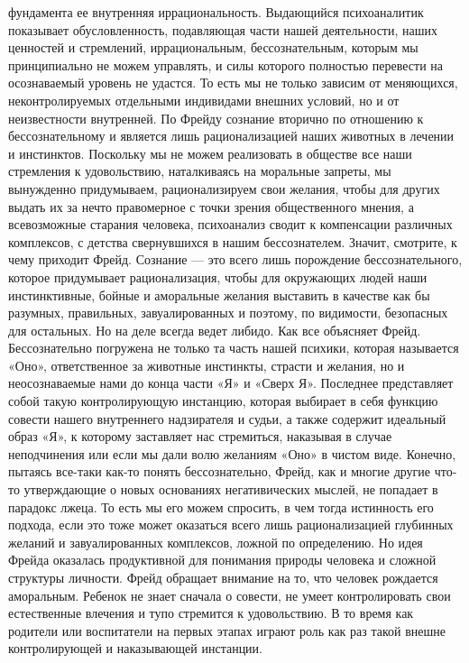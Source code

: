 фундамента ее внутренняя иррациональность. Выдающийся психоаналитик показывает
обусловленность, подавляющая части нашей деятельности, наших ценностей и
стремлений, иррациональным, бессознательным, которым мы принципиально не можем
управлять, и силы которого полностью перевести на осознаваемый уровень не
удастся. То есть мы не только зависим от меняющихся, неконтролируемых отдельными
индивидами внешних условий, но и от неизвестности внутренней. По Фрейду сознание
вторично по отношению к бессознательному и является лишь рационализацией наших
животных в лечении и инстинктов. Поскольку мы не можем реализовать в обществе
все наши стремления к удовольствию, наталкиваясь на моральные запреты, мы
вынужденно придумываем, рационализируем свои желания, чтобы для других выдать их
за нечто правомерное с точки зрения общественного мнения, а всевозможные
старания человека, психоанализ сводит к компенсации различных комплексов, с
детства свернувшихся в нашим бессознателем. Значит, смотрите, к чему приходит
Фрейд. Сознание — это всего лишь порождение бессознательного, которое
придумывает рационализация, чтобы для окружающих людей наши инстинктивные,
бойные и аморальные желания выставить в качестве как бы разумных, правильных,
завуалированных и поэтому, по видимости, безопасных для остальных. Но на деле
всегда ведет либидо. Как все объясняет Фрейд. Бессознательно погружена не только
та часть нашей психики, которая называется «Оно», ответственное за животные
инстинкты, страсти и желания, но и неосознаваемые нами до конца части «Я» и
«Сверх Я». Последнее представляет собой такую контролирующую инстанцию, которая
выбирает в себя функцию совести нашего внутреннего надзирателя и судьи, а также
содержит идеальный образ «Я», к которому заставляет нас стремиться, наказывая в
случае неподчинения или если мы дали волю желаниям «Оно» в чистом виде. Конечно,
пытаясь все-таки как-то понять бессознательно, Фрейд, как и многие другие что-то
утверждающие о новых основаниях негативических мыслей, не попадает в парадокс
лжеца. То есть мы его можем спросить, в чем тогда истинность его подхода, если
это тоже может оказаться всего лишь рационализацией глубинных желаний и
завуалированных комплексов, ложной по определению. Но идея Фрейда оказалась
продуктивной для понимания природы человека и сложной структуры личности. Фрейд
обращает внимание на то, что человек рождается аморальным. Ребенок не знает
сначала о совести, не умеет контролировать свои естественные влечения и тупо
стремится к удовольствию. В то время как родители или воспитатели на первых
этапах играют роль как раз такой внешне контролирующей и наказывающей инстанции.
